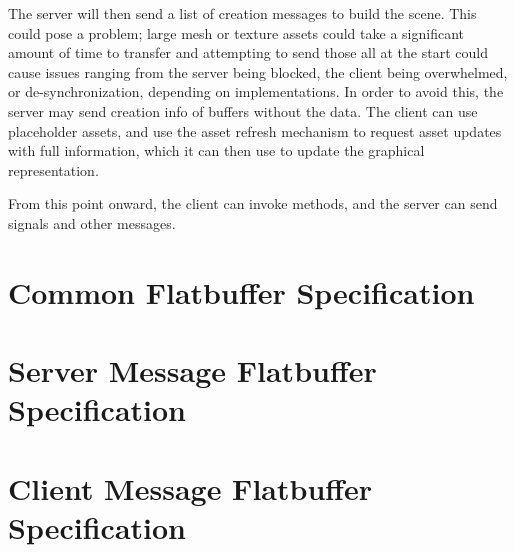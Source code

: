 \documentclass[11pt, oneside]{amsart}
\begin{document}
The server will then send a list of creation messages to build the scene. This could pose a problem; large mesh or texture assets could take a significant amount of time to transfer and attempting to send those all at the start could cause issues ranging from the server being blocked, the client being overwhelmed, or de-synchronization, depending on implementations. In order to avoid this, the server may send creation info of buffers without the data. The client can use placeholder assets, and use the asset refresh mechanism to request asset updates with full information, which it can then use to update the graphical representation.

From this point onward, the client can invoke methods, and the server can send signals and other messages.

\appendix

\section{Common Flatbuffer Specification}



\section{Server Message Flatbuffer Specification}


\section{Client Message Flatbuffer Specification}

\end{document}
